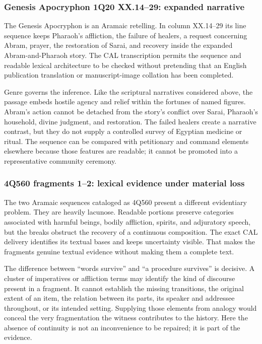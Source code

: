 \subsubsection{Genesis Apocryphon 1Q20 XX.14--29: expanded narrative}

The Genesis Apocryphon is an Aramaic retelling. In column XX.14--29 its line
sequence keeps Pharaoh's affliction, the failure of healers, a request
concerning Abram, prayer, the restoration of Sarai, and recovery inside the
expanded Abram-and-Pharaoh story. The CAL transcription permits the sequence
and readable lexical architecture to be checked without pretending that an
English publication translation or manuscript-image collation has been
completed.

Genre governs the inference. Like the scriptural narratives considered above,
the passage embeds hostile agency and relief within the fortunes of named
figures. Abram's action cannot be detached from the story's conflict over
Sarai, Pharaoh's household, divine judgment, and restoration. The failed
healers create a narrative contrast, but they do not supply a controlled
survey of Egyptian medicine or ritual. The sequence can be compared with
petitionary and command elements elsewhere because those features are
readable; it cannot be promoted into a representative community ceremony.

\subsubsection{4Q560 fragments 1--2: lexical evidence under material loss}

The two Aramaic sequences cataloged as 4Q560 present a different evidentiary
problem. They are heavily lacunose. Readable portions preserve categories
associated with harmful beings, bodily affliction, spirits, and adjuratory
speech, but the breaks obstruct the recovery of a continuous composition.
The exact CAL delivery identifies its textual bases and keeps uncertainty
visible. That makes the fragments genuine textual evidence without making them
a complete text.

The difference between ``words survive'' and ``a procedure survives'' is
decisive. A cluster of imperatives or affliction terms may identify the kind of
discourse present in a fragment. It cannot establish the missing transitions,
the original extent of an item, the relation between its parts, its speaker
and addressee throughout, or its intended setting. Supplying those elements
from analogy would conceal the very fragmentation the witness contributes to
the history. Here the absence of continuity is not an inconvenience to be
repaired; it is part of the evidence.

